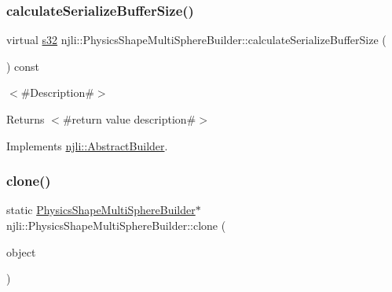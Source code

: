 \mbox{\label{classnjli_1_1_physics_shape_multi_sphere_builder_a902545dd1e34e54fdf9b8c72d9ac9998}} 
\subsubsection{\texorpdfstring{calculate\+Serialize\+Buffer\+Size()}{calculateSerializeBufferSize()}}
{\footnotesize\ttfamily virtual \mbox{\hyperlink{_util_8h_aa62c75d314a0d1f37f79c4b73b2292e2}{s32}} njli\+::\+Physics\+Shape\+Multi\+Sphere\+Builder\+::calculate\+Serialize\+Buffer\+Size (\begin{DoxyParamCaption}{ }\end{DoxyParamCaption}) const\hspace{0.3cm}{\ttfamily [virtual]}}

$<$\#\+Description\#$>$

\begin{DoxyReturn}{Returns}
$<$\#return value description\#$>$ 
\end{DoxyReturn}


Implements \mbox{\hyperlink{classnjli_1_1_abstract_builder_aa1d220053e182c37b31b427499c6eacf}{njli\+::\+Abstract\+Builder}}.

\mbox{\label{classnjli_1_1_physics_shape_multi_sphere_builder_a29dfd115d30f7459523d0df50d055dc8}} 
\subsubsection{\texorpdfstring{clone()}{clone()}}
{\footnotesize\ttfamily static \mbox{\hyperlink{classnjli_1_1_physics_shape_multi_sphere_builder}{Physics\+Shape\+Multi\+Sphere\+Builder}}$\ast$ njli\+::\+Physics\+Shape\+Multi\+Sphere\+Builder\+::clone (\begin{DoxyParamCaption}\item[{const \mbox{\hyperlink{classnjli_1_1_physics_shape_multi_sphere_builder}{Physics\+Shape\+Multi\+Sphere\+Builder}} \&}]{object }\end{DoxyParamCaption})\hspace{0.3cm}{\ttfamily [static]}}

